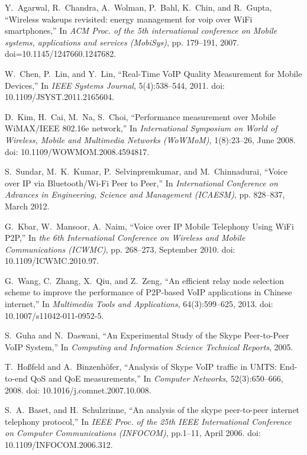 \documentclass[10pt,conference]{IEEEtran}
\begin{document}
\begin{thebibliography}{10}
Y.~Agarwal, R.~Chandra, A.~Wolman, P.~Bahl, K.~Chin, and R.~Gupta,
\newblock ``Wireless wakeups revisited: energy management for voip over WiFi
smartphones,''
\newblock In {\em ACM Proc. of the 5th international conference on Mobile
systems, applications and services (MobiSys)}, pp. 179--191, 2007.
doi=10.1145/1247660.1247682.

W.~Chen, P.~Lin, and Y.~Lin,
\newblock ``Real-Time VoIP Quality Measurement for Mobile Devices,''
\newblock In {\em IEEE Systems Journal}, 5(4):538--544, 2011.
doi: 10.1109/JSYST.2011.2165604.

D.~Kim, H.~Cai, M.~Na, S.~Choi,
\newblock ``Performance measurement over Mobile WiMAX/IEEE 802.16e network,''
\newblock In {\em International Symposium on World of Wireless, Mobile and
Multimedia Networks (WoWMoM)}, 1(8):23--26, June 2008.
doi: 10.1109/WOWMOM.2008.4594817.

S.~Sundar, M.~K.~Kumar, P.~Selvinpremkumar, and M.~Chinnadurai,
\newblock ``Voice over IP via Bluetooth/Wi-Fi Peer to Peer,''
\newblock In {\em International Conference on Advances in Engineering, Science
and Management (ICAESM)}, pp. 828--837, March 2012.

G.~Kbar, W.~Mansoor, A.~Naim,
\newblock ``Voice over IP Mobile Telephony Using WiFi P2P,''
\newblock In {\em the 6th International Conference on Wireless and Mobile
Communications (ICWMC)}, pp. 268--273, September 2010.
doi: 10.1109/ICWMC.2010.97.

G.~Wang, C.~Zhang, X.~Qiu, and Z.~Zeng,
\newblock ``An efficient relay node selection scheme to improve the performance
of P2P-based VoIP applications in Chinese internet,''
\newblock In {\em Multimedia Tools and Applications}, 64(3):599--625, 2013.
doi: 10.1007/s11042-011-0952-5.

S.~Guha and N.~Daswani,
\newblock ``An Experimental Study of the Skype Peer-to-Peer VoIP System,''
\newblock In {\em Computing and Information Science Technical
Reports}, 2005.

T.~Hoßfeld and A.~Binzenhöfer,
\newblock ``Analysis of Skype VoIP traffic in UMTS: End-to-end QoS and QoE
measurements,''
\newblock In {\em Computer Networks}, 52(3):650--666, 2008.
doi: 10.1016/j.comnet.2007.10.008.

S.~A.~Baset, and H.~Schulzrinne,
\newblock ``An analysis of the skype peer-to-peer internet telephony protocol,''
\newblock In {\em IEEE Proc. of the 25th IEEE International Conference
on Computer Communications (INFOCOM)}, pp.1--11, April 2006.
doi: 10.1109/INFOCOM.2006.312.



\end{thebibliography}
\end{document}
